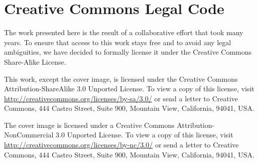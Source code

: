 \section{Creative Commons Legal Code}
\label{sec:cc}        

The work presented here is the result of a collaborative effort
that took many years.  To ensure that access to this work stays free
and to avoid any legal ambiguities, we have decided to formally license
it under the Creative Commons Share-Alike License.

This work, except the cover image, is licensed under the Creative Commons Attribution-ShareAlike 3.0 Unported License. To view a copy of this license, visit \url{http://creativecommons.org/licenses/by-sa/3.0/} or send a letter to Creative Commons, 444 Castro Street, Suite 900, Mountain View, California, 94041, USA.

The cover image is licensed under a Creative Commons Attribution-NonCommercial 3.0 Unported License.  To view a copy of this license, visit \url{http://creativecommons.org/licenses/by-nc/3.0/} or send a letter to Creative Commons, 444 Castro Street, Suite 900, Mountain View, California, 94041, USA.


